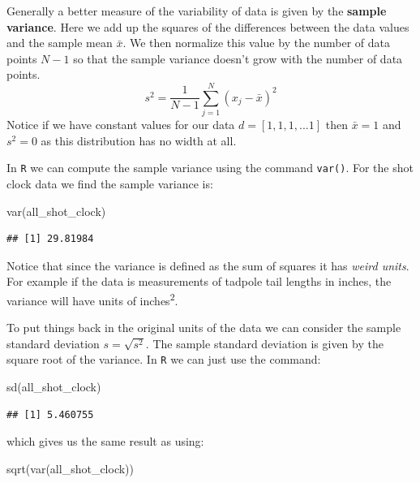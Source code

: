 \documentclass[
]{book}
\newenvironment{Shaded}{\begin{snugshade}}{\end{snugshade}}
\newcommand{\FunctionTok}[1]{\textcolor[rgb]{0.00,0.00,0.00}{#1}}
\newcommand{\NormalTok}[1]{#1}
\theoremstyle{definition}
\theoremstyle{definition}
\theoremstyle{definition}
\theoremstyle{definition}
\theoremstyle{remark}
\begin{document}
Generally a better measure of the variability of data is given by the \textbf{sample variance}. Here we add up the squares of the differences between the data values and the sample mean \(\bar{x}\). We then normalize this value by the number of data points \(N-1\) so that the sample variance doesn't grow with the number of data points.
\[s^2=\frac{1}{N-1}\sum_{j=1}^N (x_j-\bar{x})^2\]
Notice if we have constant values for our data \(d=[1,1,1,...1]\) then \(\bar{x}=1\) and \(s^2=0\) as this distribution has no width at all.

In \texttt{R} we can compute the sample variance using the command \texttt{var()}. For the shot clock data we find the sample variance is:

\begin{Shaded}
\begin{Highlighting}[]
\FunctionTok{var}\NormalTok{(all\_shot\_clock)}
\end{Highlighting}
\end{Shaded}

\begin{verbatim}
## [1] 29.81984
\end{verbatim}

Notice that since the variance is defined as the sum of squares it has \emph{weird units}. For example if the data is measurements of tadpole tail lengths in inches, the variance will have units of inches\textsuperscript{2}.

To put things back in the original units of the data we can consider the sample standard deviation \(s=\sqrt{s^2}\). The sample standard deviation is given by the square root of the variance. In \texttt{R} we can just use the command:

\begin{Shaded}
\begin{Highlighting}[]
\FunctionTok{sd}\NormalTok{(all\_shot\_clock)}
\end{Highlighting}
\end{Shaded}

\begin{verbatim}
## [1] 5.460755
\end{verbatim}

which gives us the same result as using:

\begin{Shaded}
\begin{Highlighting}[]
\FunctionTok{sqrt}\NormalTok{(}\FunctionTok{var}\NormalTok{(all\_shot\_clock))}
\end{Highlighting}
\end{Shaded}
\end{document}
